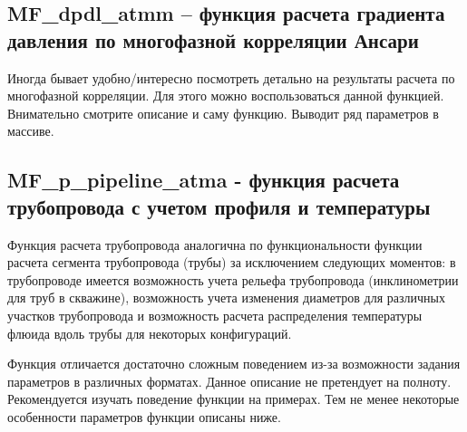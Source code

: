 
%

\subsection{MF\_dpdl\_atmm – функция расчета градиента давления по многофазной корреляции Ансари}  
Иногда бывает удобно/интересно посмотреть детально на результаты расчета по многофазной корреляции. Для этого можно воспользоваться данной функцией. Внимательно смотрите описание и саму функцию. Выводит ряд параметров в массиве.

\subsection{MF\_p\_pipeline\_atma - функция расчета трубопровода с учетом профиля и температуры}

Функция расчета трубопровода аналогична по функциональности функции расчета сегмента трубопровода (трубы) за исключением следующих моментов: в трубопроводе имеется возможность учета рельефа трубопровода (инклинометрии для труб в скважине), возможность учета изменения диаметров для различных участков трубопровода и возможность расчета распределения температуры флюида вдоль трубы для некоторых конфигураций.

Функция отличается достаточно сложным поведением из-за возможности задания параметров в различных форматах. Данное описание не претендует на полноту. Рекомендуется изучать поведение функции на примерах. Тем не менее некоторые особенности параметров функции описаны ниже.

